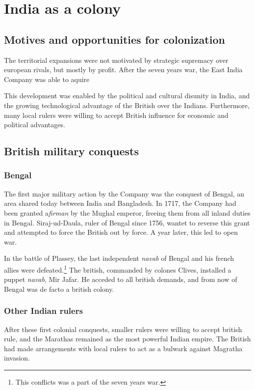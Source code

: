 \documentclass[11pt, a4paper, headings=standardclasses]{scrartcl}
\begin{document}
\section{India as a colony}

\subsection{Motives and opportunities for colonization}

The territorial expansions were not motivated by strategic supremacy over european rivals, but mostly by profit. After the seven years war, the East India Company was able to aquire 

This development was enabled by the political and cultural disunity in India, and the growing technological advantage of the British over the Indians. Furthermore, many local rulers were willing to accept British influence for economic and political advantages.

\subsection{British military conquests}

\subsubsection{Bengal}
The first major military action by the Company was the conquest of Bengal, an area shared today between India and Bangladesh. In 1717, the Company had been granted a\textit{firman} by the Mughal emperor, freeing them from all inland duties in Bengal.\autocite[257]{RF} Siraj-ud-Daula, ruler of Bengal since 1756, wantet to reverse this grant and attempted to force the British out by force. A year later, this led to open war.\autocite[258]{RF}

In the battle of Plassey, the last independent \textit{navab} of Bengal and his french allies were defeated.\footnote{This conflicts was a part of the seven years war.} The british, commanded by colones Clives, installed a puppet \textit{navab}, Mir Jafar. He acceded to all british demands, and from now of Bengal was de facto a british colony.\autocite[268]{RF}

\subsubsection{Other Indian rulers}

After these first colonial conquests, smaller rulers were willing to accept british rule\autocite[Chapter 4, sections 8 and 9]{RF}, and the Marathas remained as the most powerful Indian empire. The British had made arrangements with local rulers to act as a bulwark against Magratha invasion.\autocite[273]{RF}
\end{document}
